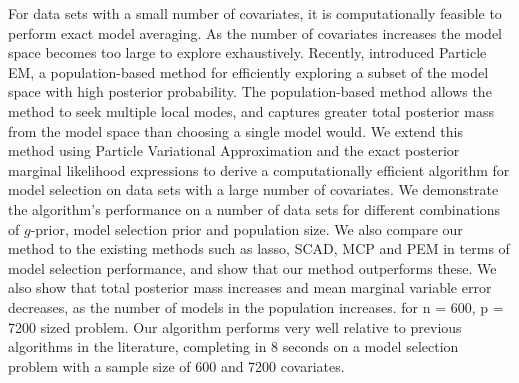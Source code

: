 \documentclass[PhD,stats]{usydthesis}[12pt]
\begin{document}
For data sets with a small number of covariates, it is computationally feasible to perform exact model
averaging. As the number of covariates increases the model space becomes too large to explore exhaustively.
Recently, \cite{Rockova2017} introduced Particle EM, a population-based method for efficiently exploring a
subset of the model space with high posterior probability. The population-based method allows the method to
seek multiple local modes, and captures greater total posterior mass from the model space than choosing a
single model would. We extend this method using Particle Variational Approximation and the exact posterior
marginal likelihood expressions to derive a computationally efficient algorithm for model selection on data
sets with a large number of covariates. We demonstrate the algorithm's performance on a number of data sets
for different combinations of $g$-prior, model selection prior and population size. We also compare our method
to the existing methods such as lasso, SCAD, MCP and PEM in terms of model selection performance,  and show
that our method outperforms these. We also show that total posterior mass increases and mean marginal variable
error decreases, as the number of models in the population increases. %
for n = 600, p = 7200 sized problem. Our algorithm performs very well relative to previous algorithms in the
literature, completing in 8 seconds on a model selection problem with a sample size of 600 and 7200
covariates.








% 

\backmatter
\appendix



\end{document}

